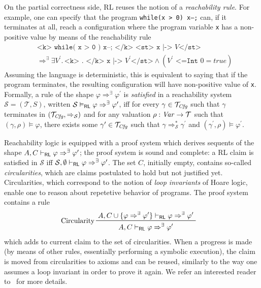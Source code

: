 On the partial correctness side, RL reuses the notion of a \emph{reachability rule}.
For example, one can specify that the program \texttt{while(x > 0) x--;}
can, if it terminates at all, reach a configuration
where the program variable \texttt{x} has a non-positive value
by means of the reachability rule
\begin{equation*}
    \begin{aligned}
        & \texttt{<k> while( x > 0 ) x--; </k> <st> x |-> } V \texttt{</st>} \\
        & \Rightarrow^\exists \exists V^\prime.\, \texttt{<k> . </k> x |-> } V^\prime \texttt{</st>} \land (V^\prime \texttt{ <=Int } 0 = \mathit{true})
    \end{aligned}
\end{equation*}
Assuming the language is deterministic, this is equivalent to saying that if the program terminates,
the resulting configuration will have non-positive value of \texttt{x}.
Formally, a rule of the shape $\varphi \Rightarrow^\exists \varphi^\prime$
is \emph{satisfied}
in a reachability system $\mathcal{S} = (\mathcal{T}, S)$,
written $\mathcal{S} \vDash_{\mathsf{RL}} \varphi \Rightarrow^\exists \varphi^\prime$,
iff for every $\gamma \in \mathcal{T}_{\mathit{Cfg}}$
such that $\gamma$ terminates in $(\mathcal{T}_{\mathit{Cfg}}, \Rightarrow_{\mathcal{S}})$
and for any valuation $\rho : \mathit{Var} \to \mathcal{T}$
such that $(\gamma, \rho) \vDash \varphi$,
there exists some $\gamma^\prime \in \mathcal{T}_{\mathit{Cfg}}$
such that
$\gamma \Rightarrow^{*}_{\mathcal{S}} \gamma^\prime$
and $(\gamma^\prime, \rho) \vDash \varphi^\prime$.


Reachability logic is equipped with a proof system which derives sequents of the shape
$A, C \vdash_{\mathsf{RL}} \varphi \Rightarrow^\exists \varphi^\prime$;
the proof system is sound and complete: a RL claim is satisfied in $\mathcal{S}$
iff $\mathcal{S}, \emptyset \vdash_{\mathsf{RL}} \varphi \Rightarrow^\exists \varphi^\prime$.
The set $C$, initially empty, contains so-called \emph{circularities},
which are claims postulated to hold but not justified yet.
Circularities, which correspond to the notion of \emph{loop invariants} of Hoare logic,
enable one to reason about repetetive behavior of programs.
The proof system contains a rule
\begin{align*}
    & \prftree[l]{Circularity}
      { A, C \cup \{ \varphi\Rightarrow^\exists \varphi^\prime \} \vdash_\RL \varphi \Rightarrow^\exists \varphi^\prime }
      { A, C \vdash_\RL \varphi \Rightarrow^\exists \varphi^\prime }
\end{align*}
which adds to current claim to the set of circularities.
When a progress is made (by means of other rules, essentially performing a symbolic execution),
the claim is moved from circularities to axioms and can be reused, similarly to the way one assumes a loop invariant
in order to prove it again.
We refer an interested reader to~\cite{RosuS12oopsla} for more details.


